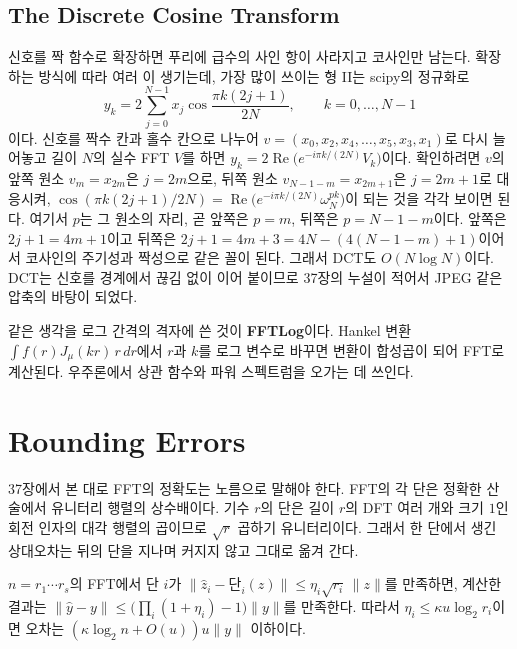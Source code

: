 \subsection{The Discrete Cosine Transform}

신호를 짝 함수로 확장하면 푸리에 급수의 사인 항이 사라지고 코사인만 남는다. 확장하는 방식에 따라 여러 이 생기는데, 가장 많이 쓰이는 형 II는 scipy의 정규화로
\[
y_k=2\sum_{j=0}^{N-1}x_j\cos\frac{\pi k(2j+1)}{2N},\qquad k=0,\dots,N-1
\]
이다\cite{ahmed1974dct}. 신호를 짝수 칸과 홀수 칸으로 나누어 $v=(x_0,x_2,x_4,\dots,x_5,x_3,x_1)$로 다시 늘어놓고 길이 $N$의 실수 FFT $V$를 하면 $y_k=2\operatorname{Re}\bigl(e^{-i\pi k/(2N)}V_k\bigr)$이다\cite{makhoul1980}. 확인하려면 $v$의 앞쪽 원소 $v_m=x_{2m}$은 $j=2m$으로, 뒤쪽 원소 $v_{N-1-m}=x_{2m+1}$은 $j=2m+1$로 대응시켜, $\cos(\pi k(2j+1)/2N)=\operatorname{Re}\bigl(e^{-i\pi k/(2N)}\omega_N^{pk}\bigr)$이 되는 것을 각각 보이면 된다. 여기서 $p$는 그 원소의 자리, 곧 앞쪽은 $p=m$, 뒤쪽은 $p=N-1-m$이다. 앞쪽은 $2j+1=4m+1$이고 뒤쪽은 $2j+1=4m+3=4N-(4(N-1-m)+1)$이어서 코사인의 주기성과 짝성으로 같은 꼴이 된다. 그래서 DCT도 $O(N\log N)$이다. DCT는 신호를 경계에서 끊김 없이 이어 붙이므로 37장의 누설이 적어서 JPEG 같은 압축의 바탕이 되었다.

같은 생각을 로그 간격의 격자에 쓴 것이 \textbf{FFTLog}이다. Hankel 변환 $\int f(r)J_\mu(kr)\,r\,dr$에서 $r$과 $k$를 로그 변수로 바꾸면 변환이 합성곱이 되어 FFT로 계산된다\cite{talman1978,hamilton2000fftlog}. 우주론에서 상관 함수와 파워 스펙트럼을 오가는 데 쓰인다.

\section{Rounding Errors}
\label{sec:fft-error}

37장에서 본 대로 FFT의 정확도는 노름으로 말해야 한다. FFT의 각 단은 정확한 산술에서 유니터리 행렬의 상수배이다. 기수 $r$의 단은 길이 $r$의 DFT 여러 개와 크기 $1$인 회전 인자의 대각 행렬의 곱이므로 $\sqrt r$ 곱하기 유니터리이다. 그래서 한 단에서 생긴 상대오차는 뒤의 단을 지나며 커지지 않고 그대로 옮겨 간다.

\begin{proposition}
\label{prop:fft-error}
$n=r_1\cdots r_s$의 FFT에서 단 $i$가 $\|\hat z_i-\text{단}_i(z)\|\le\eta_i\sqrt{r_i}\,\|z\|$를 만족하면, 계산한 결과는 $\|\hat y-y\|\le\bigl(\prod_i(1+\eta_i)-1\bigr)\|y\|$를 만족한다. 따라서 $\eta_i\le\kappa u\log_2r_i$이면 오차는 $(\kappa\log_2n+O(u))u\|y\|$ 이하이다.
\end{proposition}

